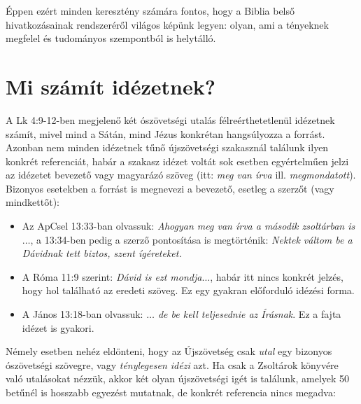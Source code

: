 \documentclass{article}
\begin{document}
Éppen ezért minden keresztény számára fontos, hogy a Biblia belső hivatkozásainak rendszeréről világos képünk legyen:
olyan, ami a tényeknek megfelel és tudományos szempontból is helytálló.

\section{Mi számít idézetnek?}

A Lk 4:9-12-ben megjelenő két ószövetségi utalás félreérthetetlenül idézetnek számít, mivel
mind a Sátán, mind Jézus konkrétan hangsúlyozza a forrást. Azonban nem minden idézetnek tűnő újszövetségi
szakasznál találunk ilyen konkrét referenciát, habár a szakasz idézet voltát
sok esetben egyértelműen jelzi az idézetet bevezető vagy magyarázó szöveg (itt: \textit{meg van írva} ill.
\textit{megmondatott}). Bizonyos esetekben a forrást is megnevezi a bevezető, esetleg a szerzőt
(vagy mindkettőt):
\begin{itemize}
\item Az ApCsel 13:33-ban olvassuk: \textit{Ahogyan meg van írva a második zsoltárban is$\ldots$}, a 13:34-ben
pedig a szerző pontosítása is megtörténik: \textit{Nektek váltom be a Dávidnak tett biztos, szent ígéreteket.}
\item A Róma 11:9 szerint: \textit{Dávid is ezt mondja$\ldots$}, habár itt nincs konkrét jelzés, hogy hol
található az eredeti szöveg. Ez egy gyakran előforduló idézési forma.
\item A János 13:18-ban olvassuk: \textit{$\ldots$ de be kell teljesednie az Írásnak}. Ez a fajta idézet
is gyakori.
\end{itemize}
Némely esetben nehéz eldönteni, hogy az Újszövetség csak \textit{utal} egy bizonyos ószövetségi szövegre,
vagy \textit{ténylegesen idézi} azt. Ha csak a Zsoltárok könyvére való utalásokat nézzük, akkor két olyan újszövetségi
igét is találunk, amelyek 50 betűnél is hosszabb egyezést mutatnak, de konkrét referencia nincs megadva:
\end{document}
